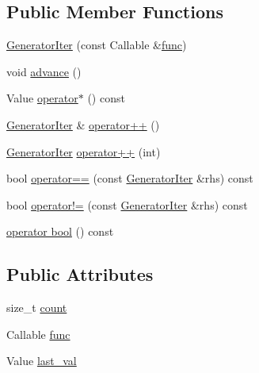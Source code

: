 \subsection*{Public Member Functions}
\begin{DoxyCompactItemize}
\item 
\hyperlink{struct_wire_cell_1_1_generator_iter_af83b73da6292cce8ab5548afefa69bb7}{Generator\+Iter} (const Callable \&\hyperlink{struct_wire_cell_1_1_generator_iter_a463078840ddad21cde38fa77db42ae64}{func})
\item 
void \hyperlink{struct_wire_cell_1_1_generator_iter_a3b5e2a57fd913539527a00a2600f32b0}{advance} ()
\item 
Value \hyperlink{struct_wire_cell_1_1_generator_iter_a6ef28188ca78788ba30d7960b2b48e12}{operator$\ast$} () const
\item 
\hyperlink{struct_wire_cell_1_1_generator_iter}{Generator\+Iter} \& \hyperlink{struct_wire_cell_1_1_generator_iter_afdbd700ee6f8d0e518b39ec585de2af8}{operator++} ()
\item 
\hyperlink{struct_wire_cell_1_1_generator_iter}{Generator\+Iter} \hyperlink{struct_wire_cell_1_1_generator_iter_a017176bffd48d6849a86840c21a0d97e}{operator++} (int)
\item 
bool \hyperlink{struct_wire_cell_1_1_generator_iter_aad7a21fe64122c1626f6af8c7d42d7c6}{operator==} (const \hyperlink{struct_wire_cell_1_1_generator_iter}{Generator\+Iter} \&rhs) const
\item 
bool \hyperlink{struct_wire_cell_1_1_generator_iter_a5d54d0b9600540460ee19c5bbc0f0bc7}{operator!=} (const \hyperlink{struct_wire_cell_1_1_generator_iter}{Generator\+Iter} \&rhs) const
\item 
\hyperlink{struct_wire_cell_1_1_generator_iter_a1d40f6d528073e96818ea1db9580efa3}{operator bool} () const
\end{DoxyCompactItemize}
\subsection*{Public Attributes}
\begin{DoxyCompactItemize}
\item 
size\+\_\+t \hyperlink{struct_wire_cell_1_1_generator_iter_a1a458da534a9445b1cffc79256218e0b}{count}
\item 
Callable \hyperlink{struct_wire_cell_1_1_generator_iter_a463078840ddad21cde38fa77db42ae64}{func}
\item 
Value \hyperlink{struct_wire_cell_1_1_generator_iter_a7b7468149505fd80fbac1ae6a1d77a33}{last\+\_\+val}
\end{DoxyCompactItemize}


